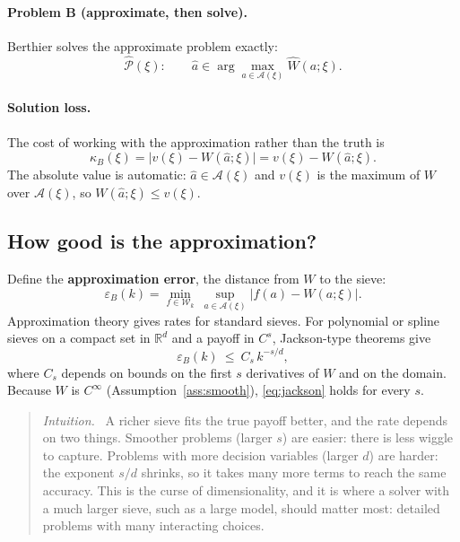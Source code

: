 \documentclass[11pt]{article}
\newcommand{\Ber}{\textcolor{ber}{Berthier}}
\theoremstyle{remark}
\newenvironment{intuition}{\begin{quote}\small\color{muted}\textit{Intuition.}\ }{\end{quote}}
\newcommand{\Acal}{\mathcal{A}}
\begin{document}
\paragraph{Problem B (approximate, then solve).} \Ber{} solves the approximate problem exactly:
\begin{equation}\label{eq:berthier}
\hat{\mathcal{P}}(\xi):\qquad \hat a\in\arg\max_{a\in\Acal(\xi)}\hat W(a;\xi).
\end{equation}

\paragraph{Solution loss.} The cost of working with the approximation rather than the truth is
\begin{equation}\label{eq:kappaB}
\kappa_B(\xi)=\big|v(\xi)-W(\hat a;\xi)\big|=v(\xi)-W(\hat a;\xi).
\end{equation}
The absolute value is automatic: $\hat a\in\Acal(\xi)$ and $v(\xi)$ is the maximum of $W$ over $\Acal(\xi)$, so $W(\hat a;\xi)\le v(\xi)$.

\subsection{How good is the approximation?}

Define the \textbf{approximation error}, the distance from $W$ to the sieve:
\begin{equation}\label{eq:epsB}
\varepsilon_B(k)=\min_{f\in\mathcal{W}_k}\ \sup_{a\in\Acal(\xi)}\big|f(a)-W(a;\xi)\big|.
\end{equation}
Approximation theory gives rates for standard sieves. For polynomial or spline sieves on a compact set in $\mathbb{R}^d$ and a payoff in $C^s$, Jackson-type theorems give
\begin{equation}\label{eq:jackson}
\varepsilon_B(k)\ \le\ C_s\,k^{-s/d},
\end{equation}
where $C_s$ depends on bounds on the first $s$ derivatives of $W$ and on the domain. Because $W$ is $C^\infty$ (Assumption~\ref{ass:smooth}), \eqref{eq:jackson} holds for every $s$.

\begin{intuition}
A richer sieve fits the true payoff better, and the rate depends on two things. Smoother problems (larger $s$) are easier: there is less wiggle to capture. Problems with more decision variables (larger $d$) are harder: the exponent $s/d$ shrinks, so it takes many more terms to reach the same accuracy. This is the curse of dimensionality, and it is where a solver with a much larger sieve, such as a large model, should matter most: detailed problems with many interacting choices.
\end{intuition}
\end{document}
